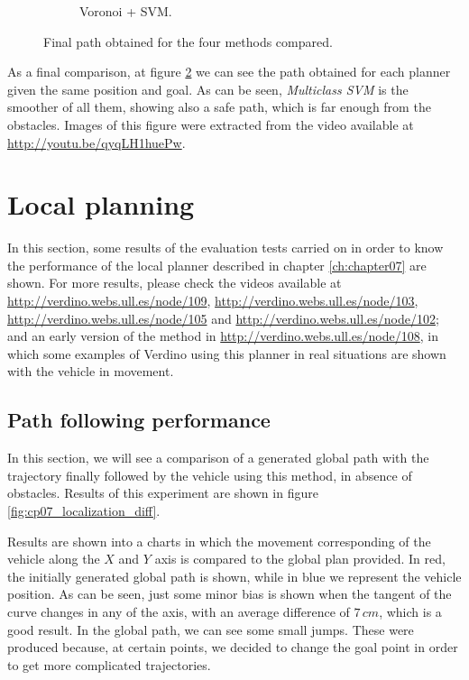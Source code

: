 \begin{figure}[h!]
\begin{subfigure}[b]{0.45\textwidth}
	  \caption{Voronoi + \ac{SVM}.}
	  \label{fig:cp06_voronoi_svm_final}
  \end{subfigure}
  \caption{Final path obtained for the four methods compared.}\label{fig:cp06_final_path_comparison}
\end{figure}

As a final comparison, at figure \ref{fig:cp06_final_path_comparison} we can see the path obtained for each planner given the same position and goal. As can be seen, \textit{Multiclass \ac{SVM}} is the smoother of all them, showing also a safe path, which is far enough from the obstacles. Images of this figure were extracted from the video available at \url{http://youtu.be/qyqLH1huePw}.

\graphicspath{{./images/chapter07/bmps/}{./images/chapter07/vects/}{./images/chapter07/}}

\section{Local planning}\label{ch:chapter07_02}

In this section, some results of the evaluation tests carried on in order to know the performance of the local planner described in chapter \ref{ch:chapter07} are shown. For more results, please check the videos available at \url{http://verdino.webs.ull.es/node/109}, \url{http://verdino.webs.ull.es/node/103}, \url{http://verdino.webs.ull.es/node/105} and \url{http://verdino.webs.ull.es/node/102}; and an early version of the method in \url{http://verdino.webs.ull.es/node/108}, in which some examples of Verdino using this planner in real situations are shown with the vehicle in movement.

\subsection{Path following performance}\label{ch:chapter07_02_01}

In this section, we will see a comparison of a generated global path with the trajectory finally followed by the vehicle using this method, in absence of obstacles. Results of this experiment are shown in figure \ref{fig:cp07_localization_diff}.


Results are shown into a charts in which the movement corresponding of the vehicle along the $X$ and $Y$ axis is compared to the global plan provided. In red, the initially generated global path is shown, while in blue we represent the vehicle position. As can be seen, just some minor bias is shown when the tangent of the curve changes in any of the axis, with an average difference of $7\,cm$, which is a good result. In the global path, we can see some small jumps. These were produced because, at certain points, we decided to change the goal point in order to get more complicated trajectories.

